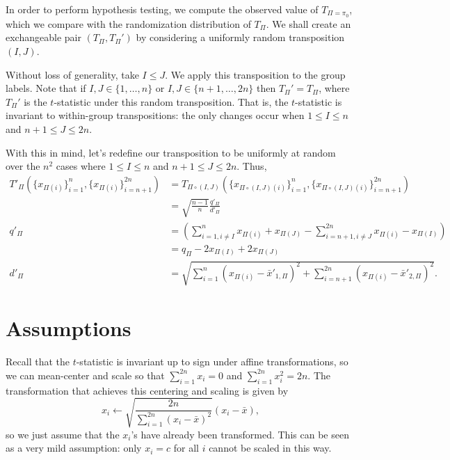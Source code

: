 In order to perform hypothesis testing, we compute the observed value
of $T_{\Pi=\pi_0}$, which we compare with the randomization
distribution of $T_{\Pi}$.  We shall create an exchangeable pair
$(T_{\Pi}, T_{\Pi}')$ by considering a uniformly random transposition
$(I, J)$.

Without loss of generality, take $I \leq J$.  We apply this transposition to the
group labels.  Note that if $I, J \in \{1,\ldots,n\}$ or $I, J \in
\{n+1,\ldots,2n\}$ then $T_{\Pi}' = T_{\Pi}$, where $T_{\Pi}'$ is the
$t$-statistic under this random transposition.  That is, the
$t$-statistic is invariant to within-group transpositions: the only
changes occur when $1 \leq I \leq n$ and $n + 1 \leq J \leq 2n$.

With this in mind, let's redefine our transposition to be uniformly at
random over the $n^2$ cases where $1 \leq I \leq n$ and $n + 1 \leq J
\leq 2n$. Thus,
\begin{align*}
  T'_{\Pi}(\{x_{\Pi(i)}\}_{i=1}^n, \{x_{\Pi(i)}\}_{i=n+1}^{2n})
  &= T_{\Pi \circ (I,J)}(\{x_{\Pi \circ (I,J)(i)}\}_{i=1}^n, \{x_{\Pi \circ (I,J)(i)}\}_{i=n+1}^{2n}) \\
  &= \sqrt{\frac{n-1}{n}}\frac{q'_{\Pi}}{d'_{\Pi}} \\
  q'_{\Pi} &= \left (\sum_{i=1, i\neq I}^n x_{\Pi(i)} + x_{\Pi(J)} -
    \sum_{i=n+1, i\neq J}^{2n}x_{\Pi(i)} - x_{\Pi(I)} \right ) \\
  &= q_{\Pi} - 2x_{\Pi(I)} + 2x_{\Pi(J)} \\
  d'_{\Pi} &= \sqrt{\sum_{i=1}^n(x_{\Pi(i)} - \bar{x}'_{1, \Pi})^{2} +
    \sum_{i=n+1}^{2n}(x_{\Pi(i)} - \bar{x}'_{2, \Pi})^{2}}.
\end{align*}

\section{Assumptions}
Recall that the $t$-statistic is invariant up to sign under affine
transformations, so we can mean-center and scale so that
$\sum_{i=1}^{2n} x_{i} = 0$ and $\sum_{i=1}^{2n} x_{i}^2 = 2n$.  The
transformation that achieves this centering and scaling is given by
\begin{equation}
  x_i \leftarrow \sqrt{\frac{2n}{\sum_{i=1}^{2n} (x_{i} - \bar{x})^2}}(x_{i}-\bar{x}),
\end{equation}
so we just assume that the $x_{i}$'s have already been transformed.
This can be seen as a very mild assumption: only $x_i = c$ for all $i$
cannot be scaled in this way.

